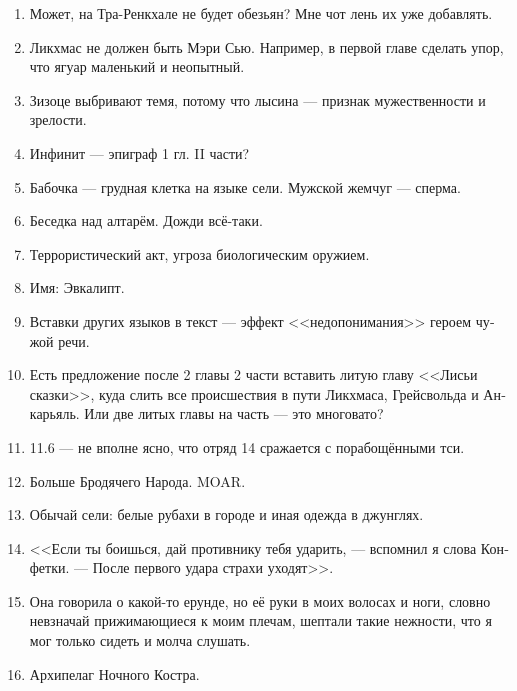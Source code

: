 \documentclass[a4paper,12pt,fleqn]{book}\usepackage{cooltooltips}\usepackage{polyglossia}\setdefaultlanguage[babelshorthands=true]{russian}\setotherlanguage{english}\defaultfontfeatures{Ligatures=TeX,Mapping=tex-text} \usepackage{xcolor}\definecolor{lightgray}{HTML}{bbbbbb}\color{lightgray}\newcommand{\ml}[3]{\textenglish{\textcolor{black}{#3}}}
\begin{document}
{\begin{enumerate}
\item Может, на Тра-Ренкхале не будет обезьян?
Мне чот лень их уже добавлять.

\item Ликхмас не должен быть Мэри Сью.
Например, в первой главе сделать упор, что ягуар маленький и неопытный.

\item Зизоце выбривают темя, потому что лысина --- признак мужественности и зрелости.

\item Инфинит --- эпиграф 1 гл. II части?

\item Бабочка --- грудная клетка на языке сели.
Мужской жемчуг --- сперма.

\item Беседка над алтарём.
Дожди всё-таки.

\item Террористический акт, угроза биологическим оружием.

\item Имя: Эвкалипт.

\item Вставки других языков в текст --- эффект <<недопонимания>> героем чужой речи.

\item Есть предложение после 2 главы 2 части вставить литую главу <<Лисьи сказки>>, куда слить все происшествия в пути Ликхмаса, Грейсвольда и Анкарьяль.
Или две литых главы на часть --- это многовато?

\item 11.6 --- не вполне ясно, что отряд 14 сражается с порабощёнными тси.

\item Больше Бродячего Народа.
MOAR.

\item Обычай сели: белые рубахи в городе и иная одежда в джунглях.

\item <<Если ты боишься, дай противнику тебя ударить, --- вспомнил я слова Конфетки.
--- После первого удара страхи уходят>>.

\item Она говорила о какой-то ерунде, но её руки в моих волосах и ноги, словно невзначай прижимающиеся к моим плечам, шептали такие нежности, что я мог только сидеть и молча слушать.

\item Архипелаг Ночного Костра.


\end{enumerate}}
\end{document}
